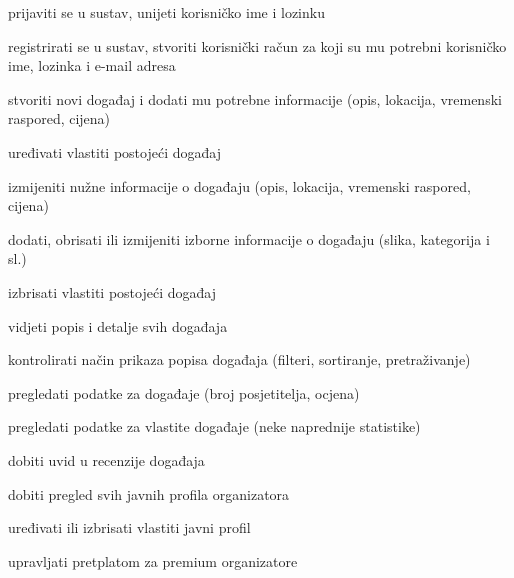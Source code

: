 			\begin{packed_enum}
				\item {}
				
				\begin{packed_enum}
					
					\item prijaviti se u sustav, unijeti korisničko ime i lozinku
					\item registrirati se u sustav, stvoriti korisnički račun za koji su mu potrebni korisničko ime, lozinka i e-mail adresa

				\end{packed_enum}

				\item  {}
				
				\begin{packed_enum}
					
					\item stvoriti novi događaj i dodati mu potrebne informacije (opis, lokacija, vremenski raspored, cijena)
					\item uređivati vlastiti postojeći događaj
					\begin{packed_enum}
						
						\item izmijeniti nužne informacije o događaju (opis, lokacija, vremenski raspored, cijena)
						\item dodati, obrisati ili izmijeniti izborne informacije o događaju (slika, kategorija i sl.)
						
					\end{packed_enum}
					\item izbrisati vlastiti postojeći događaj
					\item vidjeti popis i detalje svih događaja
					\begin{packed_enum}
						\item kontrolirati način prikaza popisa događaja (filteri, sortiranje, pretraživanje)
					\end{packed_enum}
					\item pregledati podatke za događaje (broj posjetitelja, ocjena)
					\item pregledati podatke za vlastite događaje (neke naprednije statistike)
					\item dobiti uvid u recenzije događaja
					\item dobiti pregled svih javnih profila organizatora
					\item uređivati ili izbrisati vlastiti javni profil
					\item upravljati pretplatom za premium organizatore
					\begin{packed_enum}
						

\end{packed_enum}
\end{packed_enum}
\end{packed_enum}
